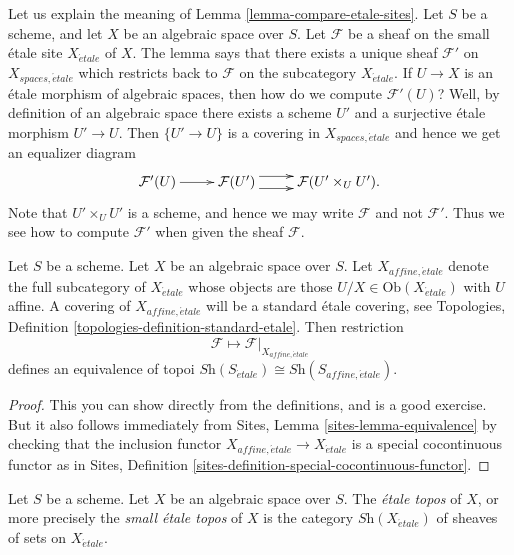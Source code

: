 \begin{remark}
\label{remark-explain-equivalence}
Let us explain the meaning of Lemma \ref{lemma-compare-etale-sites}.
Let $S$ be a scheme, and let $X$ be an algebraic space over $S$.
Let $\mathcal{F}$ be a sheaf on the small \'etale site $X_{\acute{e}tale}$ of
$X$. The lemma says that there exists a unique sheaf $\mathcal{F}'$ on
$X_{spaces, \acute{e}tale}$ which restricts back to $\mathcal{F}$ on the
subcategory $X_{\acute{e}tale}$. If $U \to X$ is an \'etale morphism of
algebraic spaces, then how do we compute $\mathcal{F}'(U)$? Well, by definition
of an algebraic space there exists a scheme $U'$ and a surjective
\'etale morphism $U' \to U$. Then $\{U' \to U\}$ is a covering in
$X_{spaces, \acute{e}tale}$ and hence we get an equalizer diagram
$$
\xymatrix{
\mathcal{F}'(U) \ar[r] &
\mathcal{F}(U') \ar@<1ex>[r] \ar@<-1ex>[r] &
\mathcal{F}(U' \times_U U').
}
$$
Note that $U' \times_U U'$ is a scheme, and hence we may
write $\mathcal{F}$ and not $\mathcal{F}'$.
Thus we see how to compute $\mathcal{F}'$
when given the sheaf $\mathcal{F}$.
\end{remark}

\begin{lemma}
\label{lemma-alternative}
Let $S$ be a scheme.
Let $X$ be an algebraic space over $S$.
Let $X_{affine, \acute{e}tale}$ denote the full subcategory of
$X_{\acute{e}tale}$ whose objects are those
$U/X \in \text{Ob}(X_{\acute{e}tale})$ with $U$ affine.
A covering of $X_{affine, \acute{e}tale}$ will be a
standard \'etale covering, see
Topologies, Definition \ref{topologies-definition-standard-etale}.
Then restriction
$$
\mathcal{F} \longmapsto \mathcal{F}|_{X_{affine, \acute{e}tale}}
$$
defines an equivalence of topoi
$\textit{Sh}(S_{\acute{e}tale}) \cong \textit{Sh}(S_{affine, \acute{e}tale})$.
\end{lemma}

\begin{proof}
This you can show directly from the definitions, and is a good exercise.
But it also follows immediately from
Sites, Lemma \ref{sites-lemma-equivalence}
by checking that the inclusion functor
$X_{affine, \acute{e}tale} \to X_{\acute{e}tale}$ is a special cocontinuous
functor as in
Sites, Definition \ref{sites-definition-special-cocontinuous-functor}.
\end{proof}

\begin{definition}
\label{definition-etale-topos}
Let $S$ be a scheme. Let $X$ be an algebraic space over $S$.
The {\it \'etale topos} of $X$, or more precisely the
{\it small \'etale topos} of $X$ is the category
$\textit{Sh}(X_{\acute{e}tale})$
of sheaves of sets on $X_{\acute{e}tale}$.
\end{definition}


